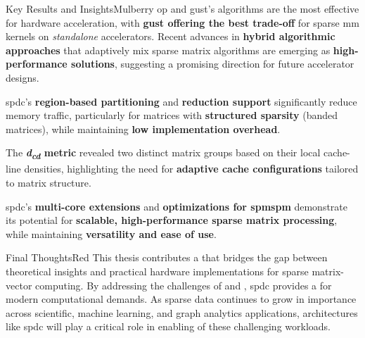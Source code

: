 

\bigskip
\begin{highlight}{Key Results and Insights}{Mulberry}
    \acrlong{op} and \acrlong{gust}'s algorithms are the most effective for hardware acceleration, with \textbf{\acrlong{gust} offering the best trade-off} for sparse \acrlong{mm} kernels on \textit{standalone} accelerators.
    Recent advances in \textbf{hybrid algorithmic approaches} that adaptively mix sparse matrix algorithms are emerging as \textbf{high-performance solutions}, suggesting a promising direction for future accelerator designs.

    \bigskip
    \acrlong{spdc}'s \textbf{region-based partitioning} and \textbf{reduction support} significantly reduce memory traffic, particularly for matrices with \textbf{structured sparsity} (\eg \gls{banded} matrices), while maintaining \textbf{low implementation overhead}.

    \bigskip
    The \textbf{\textit{d\textsubscript{cd}} metric} revealed two distinct matrix groups based on their local cache-line densities, highlighting the need for \textbf{adaptive cache configurations} tailored to matrix structure.

    \bigskip
    \acrlong{spdc}'s \textbf{multi-core extensions} and \textbf{optimizations for \acrshort{spmspm}} demonstrate its potential for \textbf{scalable, high-performance sparse matrix processing}, while maintaining \textbf{versatility and ease of use}.
\end{highlight}

\bigskip
\begin{highlight}{Final Thoughts}{Red}
    This thesis contributes a  that bridges the gap between theoretical insights and practical hardware implementations for sparse matrix-vector computing.
    By addressing the challenges of  and , \acrlong{spdc} provides a  for modern computational demands.
    As sparse data continues to grow in importance across scientific, machine learning, and graph analytics applications, architectures like \acrlong{spdc} will play a critical role in enabling  of these challenging workloads.
\end{highlight}

\cleardoublepage %
